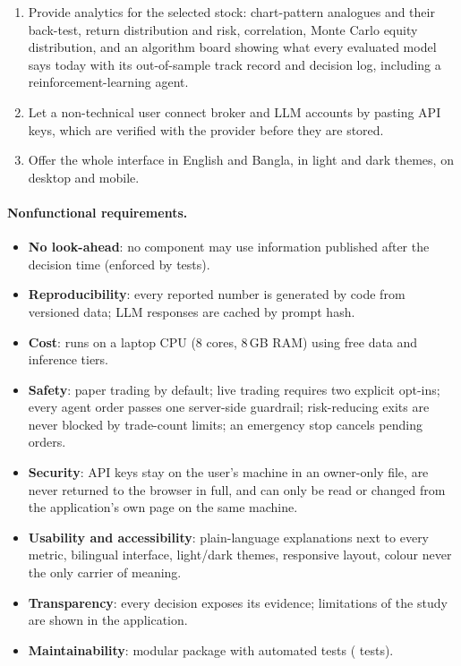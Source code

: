 \begin{enumerate}
  \item[FR13] Provide analytics for the selected stock: chart-pattern analogues and their back-test, return distribution and risk, correlation, Monte Carlo equity distribution, and an algorithm board showing what every evaluated model says today with its out-of-sample track record and decision log, including a reinforcement-learning agent.
  \item[FR14] Let a non-technical user connect broker and LLM accounts by pasting API keys, which are verified with the provider before they are stored.
  \item[FR15] Offer the whole interface in English and Bangla, in light and dark themes, on desktop and mobile.
\end{enumerate}
\paragraph{Nonfunctional requirements.}
\begin{itemize}
  \item \textbf{No look-ahead}: no component may use information published after the decision time (enforced by tests).
  \item \textbf{Reproducibility}: every reported number is generated by code from versioned data; LLM responses are cached by prompt hash.
  \item \textbf{Cost}: runs on a laptop CPU (8 cores, 8\,GB RAM) using free data and inference tiers.
  \item \textbf{Safety}: paper trading by default; live trading requires two explicit opt-ins; every agent order passes one server-side guardrail; risk-reducing exits are never blocked by trade-count limits; an emergency stop cancels pending orders.
  \item \textbf{Security}: API keys stay on the user's machine in an owner-only file, are never returned to the browser in full, and can only be read or changed from the application's own page on the same machine.
  \item \textbf{Usability and accessibility}: plain-language explanations next to every metric, bilingual interface, light/dark themes, responsive layout, colour never the only carrier of meaning.
  \item \textbf{Transparency}: every decision exposes its evidence; limitations of the study are shown in the application.
  \item \textbf{Maintainability}: modular package with automated tests (\testcount{} tests).
\end{itemize}

